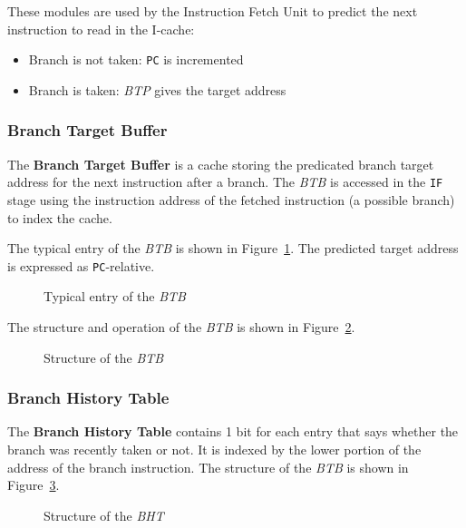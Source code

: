 \documentclass[english]{article}
\begin{document}
These modules are used by the Instruction Fetch Unit to predict the next instruction to read in the I-cache:
\begin{itemize}
  \item Branch is not taken: \texttt{PC} is incremented
  \item Branch is taken: \textit{BTP} gives the target address
\end{itemize}

\subsubsection{Branch Target Buffer}

The \textbf{Branch Target Buffer} is a cache storing the predicated branch target address for the next instruction after a branch.
The \textit{BTB} is accessed in the \texttt{IF} stage using the instruction address of the fetched instruction (a possible branch) to index the cache.

The typical entry of the \textit{BTB} is shown in Figure~\ref{fig:typical-entry-BTB}.
The predicted target address is expressed as \texttt{PC}-relative.

\begin{figure}[htbp]
  \bigskip
  \centering
  \caption{Typical entry of the \textit{BTB}}
  \label{fig:typical-entry-BTB}
  \bigskip
\end{figure}

The structure and operation of the \textit{BTB} is shown in Figure~\ref{fig:structure-of-BTB}.

\begin{figure}[htbp]
  \bigskip
  \centering
  \caption{Structure of the \textit{BTB}}
  \label{fig:structure-of-BTB}
  \bigskip
\end{figure}

\subsubsection{Branch History Table}

The \textbf{Branch History Table} contains 1 bit for each entry that says whether the branch was recently taken or not.
It is indexed by the lower portion of the address of the branch instruction.
The structure of the \textit{BTB} is shown in Figure~\ref{fig:structure-of-BHT}.

\begin{figure}[htbp]
  \bigskip
  \centering
  \caption{Structure of the \textit{BHT}}
  \label{fig:structure-of-BHT}
  \bigskip
\end{figure}
\end{document}
